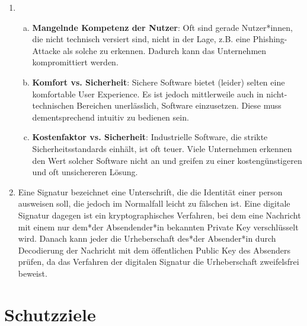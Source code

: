 \documentclass[a4paper,11pt]{scrartcl}
\begin{document}
\begin{enumerate}[1.]
    \item
        \begin{enumerate}[(a)]
            \item \textbf{Mangelnde Kompetenz der Nutzer}:
                  Oft sind gerade Nutzer*innen, die nicht technisch versiert sind,
                  nicht in der Lage, z.B. eine Phishing-Attacke als solche zu
                  erkennen. Dadurch kann das Unternehmen kompromittiert werden.
            \item \textbf{Komfort vs. Sicherheit}:
                  Sichere Software bietet (leider) selten eine komfortable
                  User Experience. Es ist jedoch mittlerweile auch in nicht-technischen
                  Bereichen unerlässlich, Software einzusetzen. Diese muss
                  dementsprechend intuitiv zu bedienen sein.
            \item \textbf{Kostenfaktor vs. Sicherheit}:
                  Industrielle Software, die strikte Sicherheitsstandards
                  einhält, ist oft teuer. Viele Unternehmen erkennen den Wert
                  solcher Software nicht an und greifen zu einer
                  kostengünstigeren und oft unsichereren Lösung.
        \end{enumerate}
    \item Eine Signatur bezeichnet eine Unterschrift, die die Identität einer person ausweisen soll, die jedoch im Normalfall leicht zu fälschen ist. Eine digitale Signatur dagegen ist ein kryptographisches Verfahren, bei dem eine Nachricht mit einem nur dem*der Absendender*in bekannten Private Key verschlüsselt wird. Danach kann jeder die Urheberschaft des*der Absender*in durch Decodierung der Nachricht mit dem öffentlichen Public Key des Absenders prüfen, da das Verfahren der digitalen Signatur die Urheberschaft zweifelsfrei beweist.
\end{enumerate}

\section{Schutzziele}
\end{document}
